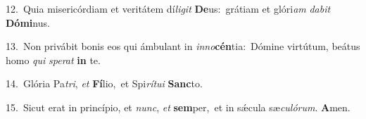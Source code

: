 {\numbfont\textcolor{\numbcolor}{12.}}~Quia misericórdiam et veritátem dí\-\textit{li}\-\textit{git} \textbf{De}\-us:~\star grátiam et glóri\textit{am} \textit{da}\-\textit{bit} \textbf{Dó}\-\textbf{mi}nus.\par
{\numbfont\textcolor{\numbcolor}{13.}}~Non privábit bonis eos qui ámbulant in \textit{in}\-\textit{no}\textbf{cén}tia:~\star Dómine virtútum, beátus homo \textit{qui} \textit{spe}\-\textit{rat} \textbf{in} te.\par
{\numbfont\textcolor{\numbcolor}{14.}}~Glória Pa\-\textit{tri}\-, \textit{et} \textbf{Fí}\-lio,~\star et Spi\-\textit{rí}\-\textit{tu}\textit{i} \textbf{Sanc}\-to.\par
{\numbfont\textcolor{\numbcolor}{15.}}~Sicut erat in princípio, et \textit{nunc}\-, \textit{et} \textbf{sem}\-per,~\star et in sǽcula sæ\-\textit{cu}\-\textit{ló}\textit{rum}. \textbf{A}\-men.\par
